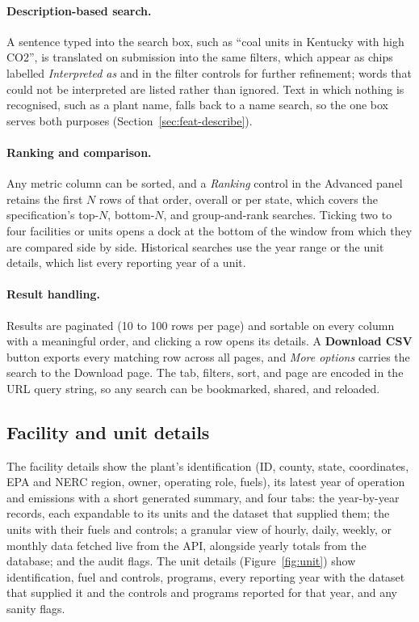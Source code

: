 \documentclass[11pt,a4paper]{article}
\begin{document}
\paragraph{Description-based search.} A sentence typed into the search box, such as ``coal units
in Kentucky with high CO2'', is translated on submission into the same filters, which appear as
chips labelled \emph{Interpreted as} and in the filter controls for further refinement; words
that could not be interpreted are listed rather than ignored. Text in which nothing is
recognised, such as a plant name, falls back to a name search, so the one box serves both
purposes (Section~\ref{sec:feat-describe}).

\paragraph{Ranking and comparison.} Any metric column can be sorted, and a \emph{Ranking}
control in the Advanced panel retains the first $N$ rows of that order, overall or per state,
which covers the specification's top-$N$, bottom-$N$, and group-and-rank searches. Ticking two to
four facilities or units opens a dock at the bottom of the window from which they are compared
side by side. Historical searches use the year range or the unit details, which list every
reporting year of a unit.

\paragraph{Result handling.} Results are paginated (10 to 100 rows per page) and sortable on
every column with a meaningful order, and clicking a row opens its details. A \textbf{Download
CSV} button exports every matching row across all pages, and \emph{More options} carries the
search to the Download page. The tab, filters, sort, and page are encoded in the URL query
string, so any search can be bookmarked, shared, and reloaded.

\subsection{Facility and unit details}

The facility details show the plant's identification (ID, county, state, coordinates, EPA and
NERC region, owner, operating role, fuels), its latest year of operation and emissions with a
short generated summary, and four tabs: the year-by-year records, each expandable to its units
and the dataset that supplied them; the units with their fuels and controls; a granular view of
hourly, daily, weekly, or monthly data fetched live from the API, alongside yearly totals from the
database; and the audit flags. The unit details (Figure~\ref{fig:unit}) show identification,
fuel and controls, programs, every reporting year with the dataset that supplied it and the
controls and programs reported for that year, and any sanity flags.
\end{document}
